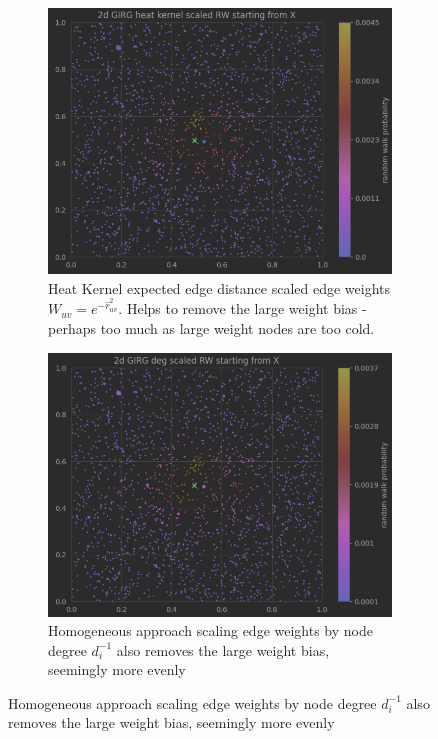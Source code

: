 \begin{figure}
  \vspace{1em}

  \begin{subfigure}{0.49\textwidth}
    \centering
    \includegraphics[width=\linewidth]{figures/2d_GIRG_heatkernelscaled_RW.png}
    \caption{Heat Kernel expected edge distance scaled edge weights $W_{uv} = e^{-\hat{r}_{uv}^2}$. Helps to remove the large weight bias - perhaps too much as large weight nodes are too cold.}
  \end{subfigure}
  \hfill
  \begin{subfigure}{0.49\textwidth}
    \centering
    \includegraphics[width=\linewidth]{figures/2d_GIRG_degscaled_RW.png}
    \caption{Homogeneous approach scaling edge weights by node degree $d_i^{-1}$  also removes the large weight bias, seemingly more evenly}

\end{subfigure}
\end{figure}
